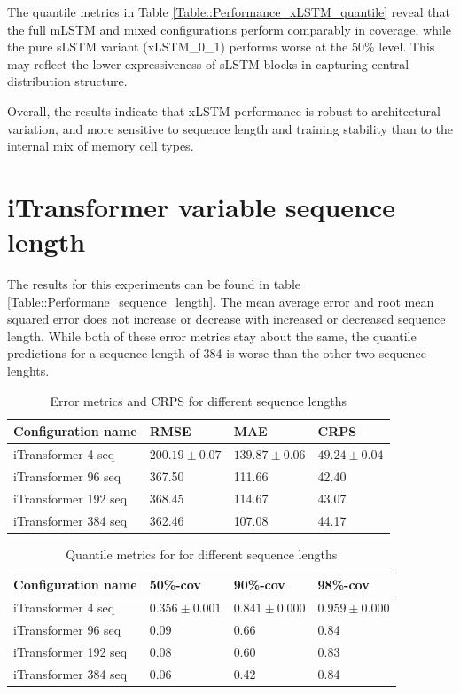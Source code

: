 \documentclass[class=scrbook, crop=false]{standalone}
\begin{document}
The quantile metrics in Table \ref{Table::Performance_xLSTM_quantile} reveal that the full mLSTM and mixed configurations perform comparably in coverage, while the pure sLSTM variant (xLSTM\_0\_1) performs worse at the 50\% level. This may reflect the lower expressiveness of sLSTM blocks in capturing central distribution structure.

Overall, the results indicate that xLSTM performance is robust to architectural variation, and more sensitive to sequence length and training stability than to the internal mix of memory cell types.


\section{iTransformer variable sequence length}

The results for this experiments can be found in table \ref{Table::Performane_sequence_length}.
The mean average error and root mean squared error does not increase or decrease with increased or decreased sequence length.
While both of these error metrics stay about the same, the quantile predictions for a sequence length of 384 is worse than the other two sequence lenghts.
 \begin{table}[]
\centering
\begin{tabular}{l|l|l|l}
 Configuration name &  RMSE 		& MAE 			& CRPS \\\hline
iTransformer 4 seq    &$ 200.19 \pm 0.07	$&$ 139.87	\pm 0.06	$&$ 49.24 \pm 0.04	$ \\
 iTransformer 96 seq & 367.50 & 111.66 & 42.40\\
 iTransformer 192 seq & 368.45 &114.67& 43.07\\
 iTransformer 384 seq & 362.46 & 107.08& 44.17\\
\end{tabular}
\caption{Error metrics and CRPS for different sequence lengths}
\label{Table::Performance_sequence_length}

\end{table}
\begin{table}
\centering
\begin{tabular}{l|l|l|l}
 Configuration name 	& 50\%-cov 		& 90\%-cov 		& 98\%-cov \\\hline
iTransformer  4 seq   	&$ 0.356	\pm 0.001	$&$ 0.841	\pm 0.000	$&$0.959 \pm 0.000	$ \\
 iTransformer 96 seq 	& 0.09 & 0.66 	& 0.84 \\
 iTransformer 192 seq 	& 0.08 & 0.60 	& 0.83 \\
 iTransformer 384 seq 	& 0.06 &0.42	& 0.84\\
\end{tabular}
\caption{Quantile metrics for for different sequence lengths}
\label{Table::Performance_sequence_length}
\end{table}
\end{document}

